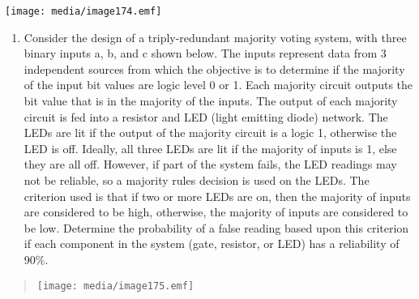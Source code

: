 \texttt{[image: media/image174.emf]}

\begin{enumerate}
\def\labelenumi{\arabic{enumi}.}
\setcounter{enumi}{11}
\item
  Consider the design of a triply-redundant majority voting system, with
  three binary inputs a, b, and c shown below. The inputs represent data
  from 3 independent sources from which the objective is to determine if
  the majority of the input bit values are logic level 0 or 1. Each
  majority circuit outputs the bit value that is in the majority of the
  inputs. The output of each majority circuit is fed into a resistor and
  LED (light emitting diode) network. The LEDs are lit if the output of
  the majority circuit is a logic 1, otherwise the LED is off. Ideally,
  all three LEDs are lit if the majority of inputs is 1, else they are
  all off. However, if part of the system fails, the LED readings may
  not be reliable, so a majority rules decision is used on the LEDs. The
  criterion used is that if two or more LEDs are on, then the majority
  of inputs are considered to be high, otherwise, the majority of inputs
  are considered to be low. Determine the probability of a false reading
  based upon this criterion if each component in the system (gate,
  resistor, or LED) has a reliability of 90\%.
\end{enumerate}

\begin{quote}
\texttt{[image: media/image175.emf]}
\end{quote}
